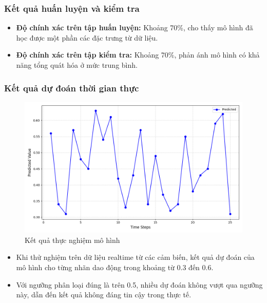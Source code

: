 \subsubsection{Kết quả huấn luyện và kiểm tra}
\begin{itemize}
    \item \textbf{Độ chính xác trên tập huấn luyện:} Khoảng 70\%, cho thấy mô hình đã học được một phần các đặc trưng từ dữ liệu.
    \item \textbf{Độ chính xác trên tập kiểm tra:} Khoảng 70\%, phản ánh mô hình có khả năng tổng quát hóa ở mức trung bình.
\end{itemize}

\subsubsection{Kết quả dự đoán thời gian thực}
\begin{figure}[H]
    \centering
    \includegraphics[width=\textwidth,height=\textheight,keepaspectratio]{Images/Experimental results/model.png}
    \caption{Kết quả thực nghiệm mô hình}
    \label{fig:enter-label}
\end{figure}
\begin{itemize}
    \item Khi thử nghiệm trên dữ liệu realtime từ các cảm biến, kết quả dự đoán của mô hình cho từng nhãn dao động trong khoảng từ 0.3 đến 0.6.
    \item Với ngưỡng phân loại đúng là trên 0.5, nhiều dự đoán không vượt qua ngưỡng này, dẫn đến kết quả không đáng tin cậy trong thực tế.
\end{itemize}

